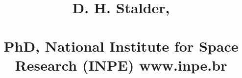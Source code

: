 \documentclass[10pt,a4paper]{moderncv}
\title{ D. H. Stalder,\\\small
	\\PhD, National Institute for Space Research (INPE) www.inpe.br}               %
\begin{document}
\maketitle

\nocite{*}

\end{document}
